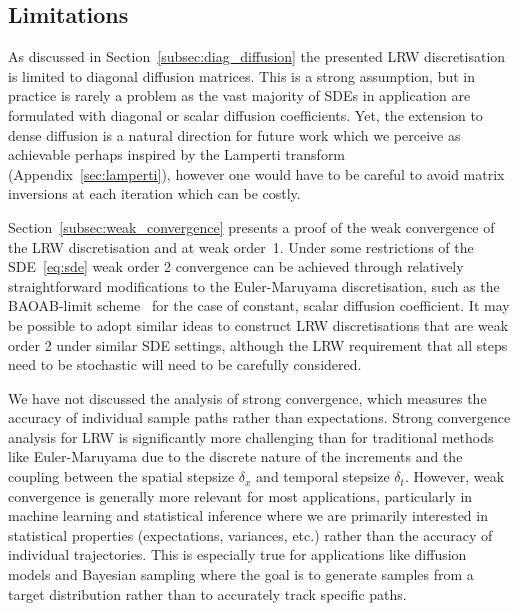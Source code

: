 \documentclass[pra,showpacs,amsmath,amssymb,amsfonts,lengthcheck,longbibliography,onecolumn]{revtex4-2}
\begin{document}
\subsection{Limitations}

As discussed in Section~\ref{subsec:diag_diffusion} the presented LRW discretisation
is limited to diagonal diffusion matrices. This is a strong assumption, but in practice
is rarely a problem as the vast majority of SDEs in application are formulated with
diagonal or scalar diffusion coefficients. Yet, the extension to dense diffusion
is a natural direction for future work which we perceive as achievable perhaps
inspired by the Lamperti transform (Appendix~\ref{sec:lamperti}), however one would
have to be careful to avoid matrix inversions at each iteration which can be costly.

Section~\ref{subsec:weak_convergence} presents a proof of the weak convergence of the 
LRW discretisation and at weak order~1. Under some restrictions of the SDE~\eqref{eq:sde}
weak order 2 convergence can be achieved through relatively straightforward modifications
to the Euler-Maruyama discretisation, such as the BAOAB-limit scheme~\cite{leimkuhler2013rational}
for the case of constant, scalar diffusion coefficient. It may be possible to adopt similar
ideas to construct LRW discretisations that are weak order 2 under similar SDE settings,
although the LRW requirement that all steps need to be stochastic will need to be carefully
considered.

We have not discussed the analysis of strong convergence, which measures the accuracy of individual sample paths 
rather than expectations. Strong convergence analysis for LRW is significantly more challenging than 
for traditional methods like Euler-Maruyama due to the discrete nature of the increments and the
coupling between the spatial stepsize $\delta_x$ and temporal stepsize $\delta_t$. However, 
weak convergence is generally more relevant for most applications, particularly in machine learning 
and statistical inference where we are primarily interested in statistical properties (expectations, 
variances, etc.) rather than the accuracy of individual trajectories. This is especially true for 
applications like diffusion models and Bayesian sampling where the goal is to generate samples from 
a target distribution rather than to accurately track specific paths.
\end{document}
